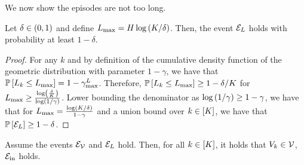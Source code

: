 We now show the episodes are not too long.
%
\begin{lemma} \label{lem:lmax}
    Let $\delta \in \left( 0, 1 \right)$ and define $L_{\max} = H \log \left( K / \delta \right)$. Then, the event $\mathcal{E}_L$ holds with probability at least $1 - \delta$.
\end{lemma}

\begin{proof}
    For any $k$ and by definition of the cumulative density function of the geometric distribution with parameter $1 - \gamma$, we have that $\mathbb{P} \left[ L_k \leq L_{\max} \right] = 1 - \gamma^L_{\max}$. Therefore, $\mathbb{P} \left[ L_k \leq L_{\max} \right] \geq 1 - \delta / K$ for $L_{\max} \geq \frac{\log \left( \frac{\delta}{K} \right)}{\log \left( 1 / \gamma \right)}$. Lower bounding the denominator as $\log \left( 1 / \gamma \right) \geq  1 - \gamma$, we have that for $L_{\max} = \frac{\log \left( K / \delta \right)}{1 - \gamma}$ and a union bound over $k \in \left[ K \right]$, we have that  $\mathbb{P} \left[ \mathcal{E}_L \right] \geq 1 - \delta$.
\end{proof}


\begin{lemma} \label{lem:iterates-in-class}
    Assume the events $\mathcal{E}_{\mathcal{V}}$ and $\mathcal{E}_L$ hold. Then, for all $k \in \left[ K \right]$, it holds that $V_k \in \mathcal{V}$, \ie $\mathcal{E}_{\mathrm{in}}$ holds.
\end{lemma}

